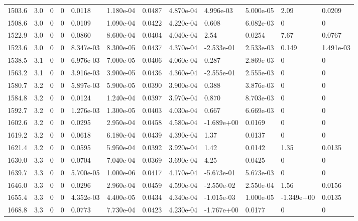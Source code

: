\documentclass[preview]{standalone}
\begin{document}
{{{{{\begin{tabular}{L{1.2cm}C{1.2cm} C{0.3cm}C{0.5cm} C{1.4cm}C{1.4cm} C{1.4cm}C{1.4cm} C{1.6cm}C{1.6cm} C{1.6cm}C{1.6cm}}
  1503.6  &   3.0  & 0     &  0 &  0.0118  & 1.180e-04  &  0.0487&   4.870e-04& 4.996e-03 & 5.000e-05   &  2.09 & 0.0209  \\ 
  1508.6  &   3.0  & 0     &  0 &  0.0109  & 1.090e-04  &  0.0422&   4.220e-04& 0.608 & 6.082e-03   &  0 & 0  \\ 
  1522.9  &   3.0  & 0     &  0 &  0.0860  & 8.600e-04  &  0.0404&   4.040e-04& 2.54 & 0.0254   &  7.67 & 0.0767  \\ 
  1523.6  &   3.0  & 0     &  0 &  8.347e-03  & 8.300e-05  &  0.0437&   4.370e-04& -2.533e-01 & 2.533e-03   &  0.149 & 1.491e-03  \\ 
  1538.5  &   3.1  & 0     &  0 &  6.976e-03  & 7.000e-05  &  0.0406&   4.060e-04& 0.287 & 2.869e-03   &  0 & 0  \\ 
  1563.2  &   3.1  & 0     &  0 &  3.916e-03  & 3.900e-05  &  0.0436&   4.360e-04& -2.555e-01 & 2.555e-03   &  0 & 0  \\ 
  1580.7  &   3.2  & 0     &  0 &  5.897e-03  & 5.900e-05  &  0.0390&   3.900e-04& 0.388 & 3.876e-03   &  0 & 0  \\ 
  1584.8  &   3.2  & 0     &  0 &  0.0124  & 1.240e-04  &  0.0397&   3.970e-04& 0.870 & 8.703e-03   &  0 & 0  \\ 
  1592.7  &   3.2  & 0     &  0 &  1.276e-03  & 1.300e-05  &  0.0403&   4.030e-04& 0.667 & 6.669e-03   &  0 & 0  \\ 
  1602.6  &   3.2  & 0     &  0 &  0.0295  & 2.950e-04  &  0.0458&   4.580e-04& -1.689e+00 & 0.0169   &  0 & 0  \\ 
  1619.2  &   3.2  & 0     &  0 &  0.0618  & 6.180e-04  &  0.0439&   4.390e-04& 1.37 & 0.0137   &  0 & 0  \\ 
  1621.4  &   3.2  & 0     &  0 &  0.0595  & 5.950e-04  &  0.0392&   3.920e-04& 1.42 & 0.0142   &  1.35 & 0.0135  \\ 
  1630.0  &   3.3  & 0     &  0 &  0.0704  & 7.040e-04  &  0.0369&   3.690e-04& 4.25 & 0.0425   &  0 & 0  \\ 
  1639.7  &   3.3  & 0     &  0 &  5.700e-05  & 1.000e-06  &  0.0417&   4.170e-04& -5.673e-01 & 5.673e-03   &  0 & 0  \\ 
  1646.0  &   3.3  & 0     &  0 &  0.0296  & 2.960e-04  &  0.0459&   4.590e-04& -2.550e-02 & 2.550e-04   &  1.56 & 0.0156  \\ 
  1655.4  &   3.3  & 0     &  0 &  4.352e-03  & 4.400e-05  &  0.0434&   4.340e-04& -1.015e-03 & 1.000e-05   &  -1.349e+00 & 0.0135  \\ 
  1668.8  &   3.3  & 0     &  0 &  0.0773  & 7.730e-04  &  0.0423&   4.230e-04& -1.767e+00 & 0.0177   &  0 & 0  \\ 

\end{tabular}}}}}}
\end{document}
